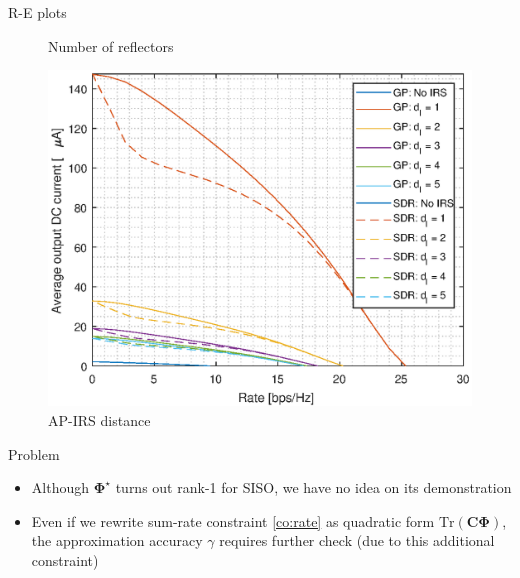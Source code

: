\documentclass[9pt]{beamer}
\begin{document}
\begin{frame}{R-E plots}
\begin{figure}[ht]
\begin{minipage}[b]{0.5\linewidth}
            \caption{Number of reflectors}
        \end{minipage}%
        \begin{minipage}[b]{0.5\linewidth}
            \centering
            \includegraphics[width=.65\linewidth]{assets/week_29_re_distance.eps}
            \caption{AP-IRS distance}
        \end{minipage}
    \end{figure}
\end{frame}

\begin{frame}{Problem}
    \begin{itemize}
        \item Although $\boldsymbol{\Phi}^{\star}$ turns out rank-1 for SISO, we have no idea on its demonstration
        \item Even if we rewrite sum-rate constraint \ref{co:rate} as quadratic form $\mathrm{Tr}(\boldsymbol{C}\boldsymbol{\Phi})$, the approximation accuracy $\gamma$ requires further check (due to this additional constraint)
    \end{itemize}
\end{frame}
\end{document}
